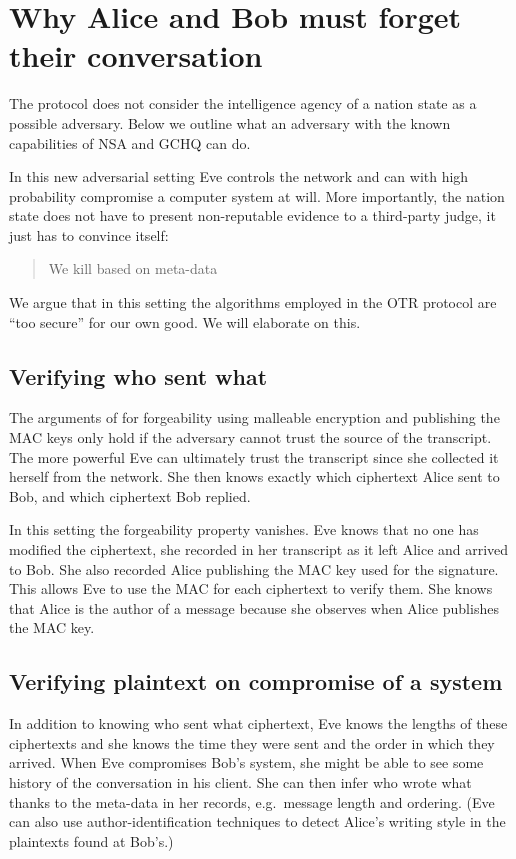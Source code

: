 \section{Why Alice and Bob must forget their conversation}
\label{sec:otrattacks}

The protocol does not consider the intelligence agency of a nation state as 
a possible adversary.
Below we outline what an adversary with the known capabilities of \ac{NSA} and 
\ac{GCHQ} can do.

In this new adversarial setting Eve controls the network and can with high 
probability compromise a computer system at will.
More importantly, the nation state does not have to present non-reputable 
evidence to a third-party judge, it just has to convince itself: 
\blockcquote{metadatakill}{We kill based on meta-data}.
We argue that in this setting the algorithms employed in the \ac{OTR} protocol 
are \enquote{too secure} for our own good.
We will elaborate on this.

\subsection{Verifying who sent what}

The arguments of \citet{otr2004} for forgeability using malleable encryption 
and publishing the \ac{MAC} keys only hold if the adversary cannot trust the 
source of the transcript.
The more powerful Eve can ultimately trust the transcript since she collected 
it herself from the network.
She then knows exactly which ciphertext Alice sent to Bob, and which ciphertext 
Bob replied.

In this setting the forgeability property vanishes.
Eve knows that no one has modified the ciphertext, she recorded in her 
transcript as it left Alice and arrived to Bob.
She also recorded Alice publishing the \ac{MAC} key used for the signature.
This allows Eve to use the \ac{MAC} for each ciphertext to verify them.
She knows that Alice is the author of a message because she observes when Alice 
publishes the \ac{MAC} key.

\subsection{Verifying plaintext on compromise of a system}

In addition to knowing who sent what ciphertext, Eve knows the lengths of these 
ciphertexts and she knows the time they were sent and the order in which they 
arrived.
When Eve compromises Bob's system, she might be able to see some history of the 
conversation in his client.
She can then infer who wrote what thanks to the meta-data in her records, 
e.g.~message length and ordering.
(Eve can also use author-identification techniques to detect Alice's writing 
style in the plaintexts found at Bob's.)

